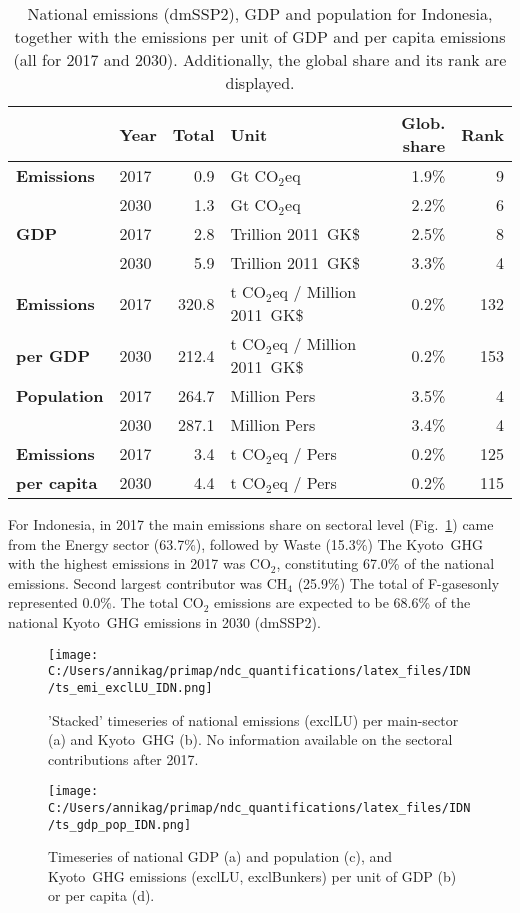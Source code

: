 \documentclass[12pt]{article}
\begin{document}
 \begin{table}[H]
 \centering
 \caption{National emissions (dmSSP2), GDP and population for Indonesia, together with the emissions per unit of GDP and per capita emissions (all for 2017 and 2030). 
 Additionally, the global share and its rank are displayed.}
 \label{tab:overview}
 \begin{tabular}{l || l r l r r}
 \bfseries  & \bfseries Year & \bfseries Total & \bfseries Unit & \bfseries Glob. share & \bfseries Rank \tabularnewline \hline \hline
 \bfseries Emissions & 2017 & 0.9 & Gt CO$_2$eq & 1.9\% & 9 \tabularnewline 
 \bfseries  & 2030 & 1.3 & Gt CO$_2$eq & 2.2\% & 6 \tabularnewline \hline
 \bfseries GDP & 2017 & 2.8 & Trillion 2011~GK\$ & 2.5\% & 8 \tabularnewline 
 \bfseries  & 2030 & 5.9 & Trillion 2011~GK\$ & 3.3\% & 4 \tabularnewline \hline
 \bfseries Emissions & 2017 & 320.8 & t CO$_2$eq / Million 2011~GK\$ & 0.2\% & 132 \tabularnewline 
 \bfseries per GDP & 2030 & 212.4 & t CO$_2$eq / Million 2011~GK\$ & 0.2\% & 153 \tabularnewline \hline
 \bfseries Population & 2017 & 264.7 & Million Pers & 3.5\% & 4 \tabularnewline 
 \bfseries  & 2030 & 287.1 & Million Pers & 3.4\% & 4 \tabularnewline \hline
 \bfseries Emissions & 2017 & 3.4 & t CO$_2$eq /  Pers & 0.2\% & 125 \tabularnewline 
 \bfseries per capita & 2030 & 4.4 & t CO$_2$eq /  Pers & 0.2\% & 115 \tabularnewline 
 \end{tabular}
 \end{table}

 For Indonesia, in 2017 the main emissions share on sectoral level (Fig.~\ref{fig:tsEmi}) came from the Energy sector (63.7\%), followed by Waste (15.3\%)
 The Kyoto~GHG with the highest emissions in 2017 was CO$_2$, constituting  67.0\% of the national emissions. 
 Second largest contributor was CH$_4$ (25.9\%)
 The total of F-gasesonly represented 0.0\%.
 The total CO$_2$ emissions are expected to be 68.6\% of the national Kyoto~GHG emissions in 2030 (dmSSP2).

 \begin{figure}[H]
 \centering
 \texttt{[image: C:/Users/annikag/primap/ndc\_quantifications/latex\_files/IDN/ts\_emi\_exclLU\_IDN.png]}
 \caption{'Stacked' timeseries of national emissions (exclLU) per main-sector (a) and Kyoto~GHG (b). 
 No information available on the sectoral contributions after 2017.}
 \label{fig:tsEmi}
 \end{figure}

 \begin{figure}[H]
 \centering
 \texttt{[image: C:/Users/annikag/primap/ndc\_quantifications/latex\_files/IDN/ts\_gdp\_pop\_IDN.png]}
 \caption{Timeseries of national GDP (a) and population (c), and Kyoto~GHG emissions (exclLU, exclBunkers) per unit of GDP (b) or per capita (d).}
 \label{fig:tsSocioEco}
 \end{figure}
\end{document}
